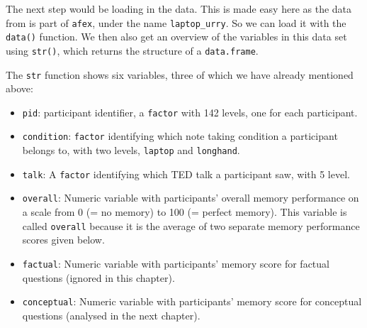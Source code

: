 \documentclass[
]{book}
\newenvironment{Shaded}{\begin{snugshade}}{\end{snugshade}}
\newcommand{\CommentTok}[1]{\textcolor[rgb]{0.56,0.35,0.01}{\textit{#1}}}
\newcommand{\FunctionTok}[1]{\textcolor[rgb]{0.00,0.00,0.00}{#1}}
\newcommand{\NormalTok}[1]{#1}
\newcommand{\StringTok}[1]{\textcolor[rgb]{0.31,0.60,0.02}{#1}}
\begin{document}
The next step would be loading in the data. This is made easy here as the data from \citet{urry2021} is part of \texttt{afex}, under the name \texttt{laptop\_urry}. So we can load it with the \texttt{data()} function. We then also get an overview of the variables in this data set using \texttt{str()}, which returns the structure of a \texttt{data.frame}.

\begin{Shaded}
\end{Shaded}

The \texttt{str} function shows six variables, three of which we have already mentioned above:

\begin{itemize}
\item
  \texttt{pid}: participant identifier, a \texttt{factor} with 142 levels, one for each participant.
\item
  \texttt{condition}: \texttt{factor} identifying which note taking condition a participant belongs to, with two levels, \texttt{laptop} and \texttt{longhand}.
\item
  \texttt{talk}: A \texttt{factor} identifying which TED talk a participant saw, with 5 level.
\item
  \texttt{overall}: Numeric variable with participants' overall memory performance on a scale from 0 (= no memory) to 100 (= perfect memory). This variable is called \texttt{overall} because it is the average of two separate memory performance scores given below.
\item
  \texttt{factual}: Numeric variable with participants' memory score for factual questions (ignored in this chapter).
\item
  \texttt{conceptual}: Numeric variable with participants' memory score for conceptual questions (analysed in the next chapter).
\end{itemize}
\end{document}
